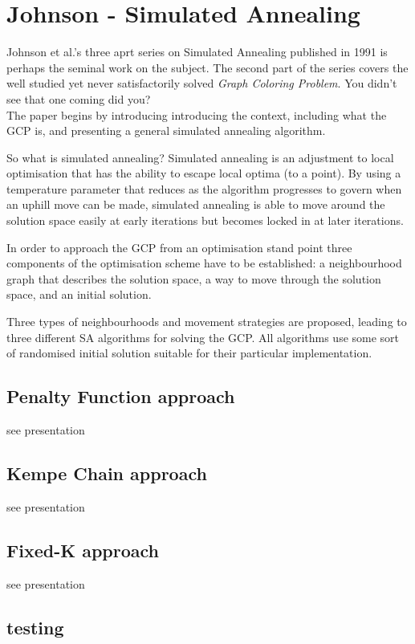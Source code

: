 \section{Johnson - Simulated Annealing}

Johnson et al.'s three aprt series on Simulated Annealing published in 1991 is perhaps the seminal work on the subject. The second part of the series covers the well studied yet never satisfactorily solved \emph{Graph Coloring Problem}. You didn't see that one coming did you?\\

The paper begins by introducing introducing the context, including what the GCP is, and presenting a general simulated annealing algorithm.

So what is simulated annealing? Simulated annealing is an adjustment to local optimisation that has the ability to escape local optima (to a point). By using a temperature parameter that reduces as the algorithm progresses to govern when an uphill move can be made, simulated annealing is able to move around the solution space easily at early iterations but becomes locked in at later iterations.

In order to approach the GCP from an optimisation stand point three components of the optimisation scheme have to be established: a neighbourhood graph that describes the solution space, a way to move through the solution space, and an initial solution.

Three types of neighbourhoods and movement strategies are proposed, leading to three different SA algorithms for solving the GCP. All algorithms use some sort of randomised initial solution suitable for their particular implementation.

\subsection{Penalty Function approach}
see presentation

\subsection{Kempe Chain approach}
see presentation

\subsection{Fixed-K approach}
see presentation

\subsection{testing}


